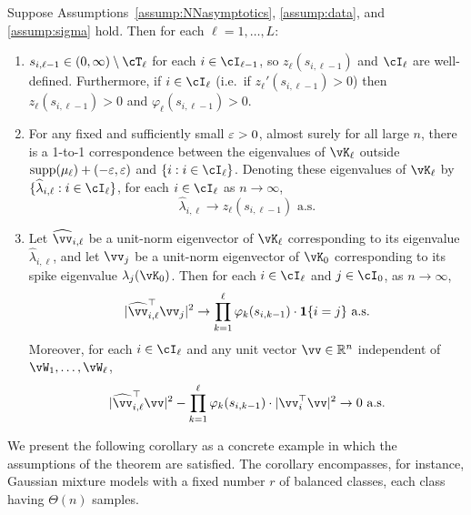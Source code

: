 \begin{theorem}\label{thm:ck_spike}
Suppose Assumptions~\ref{assump:NNasymptotics}, \ref{assump:data}, and
\ref{assump:sigma} hold.
Then for each $\ell=1,\ldots,L$:
\begin{enumerate}[label=(\alph*)]
\item $s_{i,\ell-1} \in (0,\infty) \setminus \cT_\ell$ for each $i \in \cI_{\ell-1}$,
so $z_\ell(s_{i,\ell-1})$ and $\cI_\ell$ are well-defined. Furthermore,
if $i \in \cI_\ell$ (i.e.\ if $z_\ell'(s_{i,\ell-1})>0$) then
$z_\ell(s_{i,\ell-1})>0$ and $\varphi_\ell(s_{i,\ell-1})>0$.
\item For any fixed and sufficiently small $\varepsilon>0$, almost surely for all large $n$,
there is a 1-to-1 correspondence between the eigenvalues of $\vK_\ell$
outside $\mathrm{supp}({\mu_\ell})+(-\varepsilon,\varepsilon)$ and $\{i:i\in\cI_\ell\}$.
Denoting these eigenvalues of $\vK_\ell$ by
$\{\widehat \lambda_{i,\ell}:i\in\cI_\ell\}$,
for each $i\in \cI_\ell$ as $n \to \infty$,
\[\widehat \lambda_{i,\ell} \to z_\ell(s_{i,\ell-1}) \text{ a.s.}\]
\item Let $\widehat \vv_{i,\ell}$ be a
unit-norm eigenvector of $\vK_\ell$ corresponding to its eigenvalue
$\widehat \lambda_{i,\ell}$, and let $\vv_j$ be a
unit-norm eigenvector of $\vK_0$ corresponding to its spike
eigenvalue $\lambda_j(\vK_0)$.
Then for each $i \in \cI_\ell$ and $j \in \cI_0$, as $n \to \infty$,
	\[|\widehat \vv_{i,\ell}^\top \vv_j |^2 \to  \prod_{k=1}^\ell
\varphi_{k}(s_{i,k-1}) \cdot \bI\{i=j\} \text{ a.s.}\]
Moreover, for each $i \in \cI_\ell$ and any
unit vector $\vv\in\R^n$ independent of $\vW_1,\ldots,\vW_\ell$,
	\[|\widehat \vv_{i,\ell}^\top \vv |^2-\prod_{k=1}^\ell
\varphi_{k}(s_{i,k-1}) \cdot  |\vv_i^\top \vv |^2 \to 0 \text{ a.s.}\]
\end{enumerate}
\end{theorem}
\vspace{-4mm}
We present the following corollary as a concrete example in which the
assumptions of the theorem are satisfied. The corollary encompasses, for
instance, Gaussian mixture models with a fixed number $r$ of balanced classes,
each class having $\Theta(n)$ samples.
